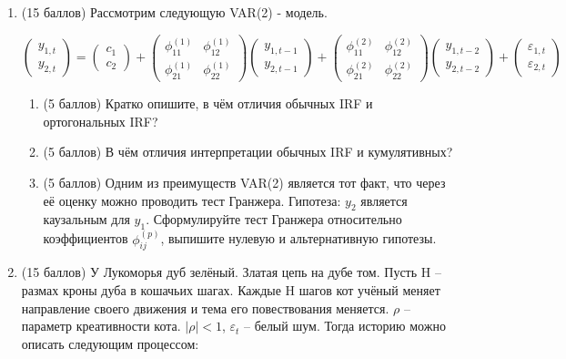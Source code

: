 \documentclass[12pt]{article}
\begin{document}
\begin{enumerate}
\item (15 баллов) Рассмотрим следующую VAR(2) - модель.

\[
\begin{pmatrix}
	y_{1,t} \\
	y_{2,t}
\end{pmatrix}
=
\begin{pmatrix}
	c_1 \\
	c_2
\end{pmatrix}
+
\begin{pmatrix}
	\phi_{11}^{(1)} & \phi_{12}^{(1)} \\
	\phi_{21}^{(1)} & \phi_{22}^{(1)}
\end{pmatrix}
\begin{pmatrix}
	y_{1,t-1} \\
	y_{2,t-1}
\end{pmatrix}
+
\begin{pmatrix}
	\phi_{11}^{(2)} & \phi_{12}^{(2)} \\
	\phi_{21}^{(2)} & \phi_{22}^{(2)}
\end{pmatrix}
\begin{pmatrix}
	y_{1,t-2} \\
	y_{2,t-2}
\end{pmatrix}
+
\begin{pmatrix}
	\varepsilon_{1,t} \\
	\varepsilon_{2,t}
\end{pmatrix}
\]

\begin{enumerate}
	\item (5 баллов) Кратко опишите, в чём отличия обычных IRF и ортогональных IRF?
	\item (5 баллов) В чём отличия интерпретации обычных IRF и кумулятивных?
	\item (5 баллов) Одним из преимуществ VAR(2) является тот факт, что через её оценку можно проводить тест Гранжера.  Гипотеза: $y_2$ является каузальным для $y_1$. Сформулируйте тест Гранжера относительно коэффициентов $\phi_{ij}^{(p)}$, выпишите нулевую и альтернативную гипотезы.
\end{enumerate}

\newpage

\item (15 баллов) У Лукоморья дуб зелёный. Златая цепь на дубе том. Пусть H -- размах кроны дуба в кошачьих шагах. Каждые H шагов кот учёный меняет направление своего движения и тема его повествования меняется. $\rho$ -- параметр креативности кота. $|\rho| < 1$, $\varepsilon_t $ -- белый шум. Тогда историю можно описать следующим процессом:


\end{enumerate}
\end{document}

